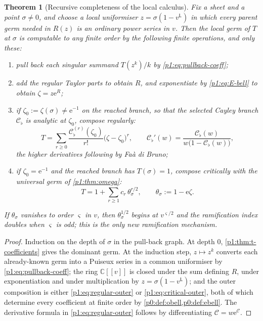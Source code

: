 \documentclass[11pt,a4paper,oneside]{book}
\theoremstyle{plain}
\newtheorem{theorem}{Theorem}[chapter]
\theoremstyle{definition}
\theoremstyle{remark}
\newcommand{\Cplx}{\mathbb{C}}
\newcommand{\e}{\mathrm{e}}
\begin{document}
\begin{theorem}[Recursive completeness of the local calculus]
\label{p1:thm:local-completeness}
Fix a sheet and a point $\sigma\ne0$, and choose a local uniformiser $z=\sigma(1-v^{\mathsf
L})$ in which every parent germ needed in $R(z)$ is an ordinary power series in $v$.  Then the
local germ of $T$ at $\sigma$ is computable to any finite order by the following finite
operations, and only these:
\begin{enumerate}
\item pull back each singular summand $T(z^{k})/k$ by
      \cref{p1:eq:pullback-coeff};
\item add the regular Taylor parts to obtain $R$, and exponentiate by
      \cref{p1:eq:E-bell} to obtain $\zeta=z\e^{R}$;
\item if $\zeta_0:=\zeta(\sigma)\ne\e^{-1}$ on the reached branch, so that
      the selected Cayley branch $\mathcal C_\flat$ is analytic at
      $\zeta_0$, compose regularly:
      \begin{equation}
       T=\sum_{r\ge0}\frac{\mathcal C_\flat^{(r)}(\zeta_0)}{r!}
       \bigl(\zeta-\zeta_0\bigr)^{r},
       \qquad
       \mathcal C_\flat'(w)=\frac{\mathcal C_\flat(w)}
       {w\bigl(1-\mathcal C_\flat(w)\bigr)},
       \label{p1:eq:regular-outer}
      \end{equation}
      the higher derivatives following by Fa\`a di Bruno;
\item if $\zeta_0=\e^{-1}$ and the reached branch has $T(\sigma)=1$, compose
      critically with the universal germ of \cref{p1:thm:omega}:
      \begin{equation}
       T=1+\sum_{r\ge1}c_r\,\theta_\sigma^{r/2},
       \qquad \theta_\sigma:=1-\e\zeta .
       \label{p1:eq:critical-outer}
      \end{equation}
\end{enumerate}
If $\theta_\sigma$ vanishes to order $\varsigma$ in $v$, then $\theta_\sigma^{1/2}$ begins at
$v^{\varsigma/2}$ and the ramification index doubles when $\varsigma$ is odd; this is the only
new ramification mechanism.
\end{theorem}

\begin{proof}
Induction on the depth of $\sigma$ in the pull-back graph.  At depth $0$,
\cref{p1:thm:t-coefficients} gives the dominant germ.  At the induction step, $z\mapsto z^{k}$
converts each already-known germ into a Puiseux series in a common uniformiser by
\cref{p1:eq:pullback-coeff}; the ring $\Cplx[[v]]$ is closed under the sum defining $R$, under
exponentiation and under multiplication by $z=\sigma(1-v^{\mathsf L})$; and the outer
composition is either \cref{p1:eq:regular-outer} or \cref{p1:eq:critical-outer}, both of which
determine every coefficient at finite order by \cref{p0:def:obell,p0:def:ebell}. The
derivative formula in \cref{p1:eq:regular-outer} follows by differentiating $\mathcal
C=w\e^{\mathcal C}$.
\end{proof}
\end{document}
